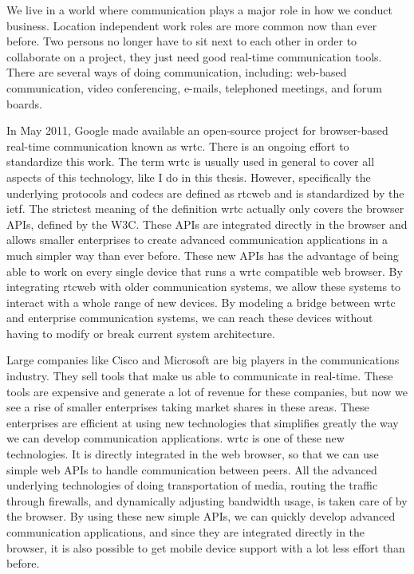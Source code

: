 We live in a world where communication plays a major role in how we conduct business. Location independent work roles are more common now than ever before. Two persons no longer have to sit next to each other in order to collaborate on a project, they just need good real-time communication tools. There are several ways of doing communication, including: web-based communication, video conferencing, e-mails, telephoned meetings, and forum boards.

In May 2011, Google made available an open-source project for browser-based real-time communication known as \gls{wrtc}\cite{google-release-of-webrtc}. There is an ongoing effort to standardize this work. The term \gls{wrtc} is usually used in general to cover all aspects of this technology, like I do in this thesis. However, specifically the underlying protocols and codecs are defined as \gls{rtcweb} and is standardized by the \gls{ietf}\cite{ietf}. The strictest meaning of the definition \gls{wrtc} actually only covers the browser APIs, defined by the W3C\cite{w3c}. These APIs are integrated directly in the browser and allows smaller enterprises to create advanced communication applications in a much simpler way than ever before. These new APIs has the advantage of being able to work on every single device that runs a \gls{wrtc} compatible web browser. By integrating \gls{rtcweb} with older communication systems, we allow these systems to interact with a whole range of new devices. By modeling a bridge between \gls{wrtc} and enterprise communication systems, we can reach these devices without having to modify or break current system architecture.

Large companies like Cisco and Microsoft are big players in the communications industry. They sell tools that make us able to communicate in real-time. These tools are expensive and generate a lot of revenue for these companies, but now we see a rise of smaller enterprises taking market shares in these areas. These enterprises are efficient at using new technologies that simplifies greatly the way we can develop communication applications. \gls{wrtc} is one of these new technologies. It is directly integrated in the web browser, so that we can use simple web APIs to handle communication between peers. All the advanced underlying technologies of doing transportation of media, routing the traffic through firewalls, and dynamically adjusting bandwidth usage, is taken care of by the browser. By using these new simple APIs, we can quickly develop advanced communication applications, and since they are integrated directly in the browser, it is also possible to get mobile device support with a lot less effort than before.

